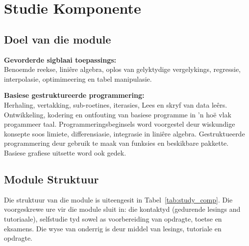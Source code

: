 \section{Studie Komponente}
 \subsection{Doel van die module}
        {\bf Gevorderde sigblaai toepassings:} \\
        Benoemde reekse, lini\^{e}re algebra,
        oplos van gelyktydige vergelykings, regressie, interpolasie,
        optimimeering en tabel manipulasie.
        
        {\bf Basiese gestruktureerde programmering:} \\
        Herhaling, vertakking, sub-roetines, iterasies, Lees en skryf van data le\^{e}rs.
        Ontwikkeling, kodering en ontfouting van basiese programme in 'n ho\"{e} vlak
        progammeer taal. Programmeringsbeginsels word voorgestel deur wiskundige 
        konsepte soos limiete, differensiasie, integrasie in lini\^{e}re algebra. 
        Gestruktueerde programmering deur gebruik te maak van funksies en 
        beskikbare pakkette.  Basiese grafiese uitsette word ook gedek.

    \subsection{Module Struktuur}
	Die struktuur van die module is uiteengesit in Tabel~\ref{tab:study_comp}.
	Die voorgeskrewe ure vir die module sluit in: die kontaktyd (gedurende lesings and tutoriaale),
	selfstudie tyd sowel as voorbereiding van opdragte, toetse en 
	eksamens. Die wyse van onderrig is deur middel van lesings, tutoriale en opdragte.
    
